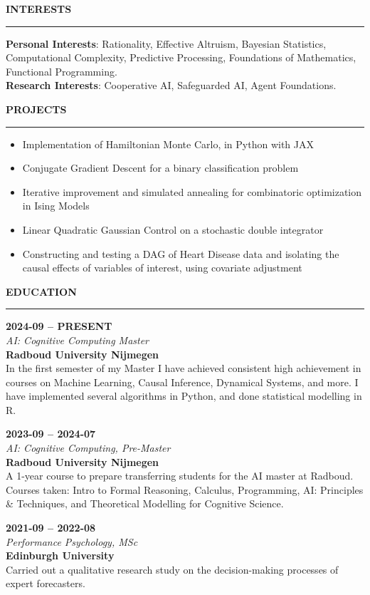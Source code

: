 \documentclass[11pt,a4paper]{article}
\newcommand{\cvsection}[1]{
    \vspace{1.0em}  %
    \par\textbf{\large #1}\smallskip\hrule
    \vspace{0.3em}  %
}
\newcommand{\entry}[4]{
    \par\textbf{#1} \hfill #2\\
    \textit{#3}\\
    #4\medskip
}
\begin{document}
\begin{multicols}{2}
\RaggedRight  %

\cvsection{INTERESTS}
\textbf{Personal Interests}: Rationality, Effective Altruism, Bayesian Statistics, Computational Complexity, Predictive Processing, Foundations of Mathematics, Functional Programming.\\
\textbf{Research Interests}: Cooperative AI, Safeguarded AI, Agent Foundations.\\

\cvsection{PROJECTS}
\begin{itemize}[leftmargin=*,nosep]
  \item Implementation of Hamiltonian Monte Carlo, in Python with JAX
  \item Conjugate Gradient Descent for a binary classification problem
  \item Iterative improvement and simulated annealing for combinatoric optimization in Ising Models
  \item Linear Quadratic Gaussian Control on a stochastic double integrator
  \item Constructing and testing a DAG of Heart Disease data and isolating the causal effects of variables of interest, using covariate adjustment
\end{itemize}


\cvsection{EDUCATION}
\entry{2024-09 -- PRESENT}{}{AI: Cognitive Computing Master}{
  \textbf{Radboud University Nijmegen}\\
  In the first semester of my Master I have achieved consistent high achievement in courses on Machine Learning, Causal Inference, Dynamical Systems, and more. I have implemented several algorithms in Python, and done statistical modelling in R.
}

\entry{2023-09 -- 2024-07}{}{AI: Cognitive Computing, Pre-Master}{
    \textbf{Radboud University Nijmegen}\\
    A 1-year course to prepare transferring students for the AI master at Radboud. Courses taken: Intro to Formal Reasoning, Calculus, Programming, AI: Principles \& Techniques, and Theoretical Modelling for Cognitive Science.
}

\entry{2021-09 -- 2022-08}{}{Performance Psychology, MSc}{
    \textbf{Edinburgh University}\\
    Carried out a qualitative research study on the decision-making processes of expert forecasters.
}



\end{multicols}
\end{document}
